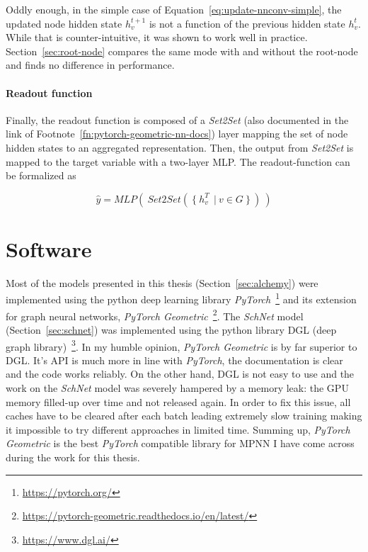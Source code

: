 \label{eq:update-nnconv-root}


Oddly enough, in the simple case of Equation~\ref{eq:update-nnconv-simple}, the updated node hidden state $h_v^{t+1}$ is not a function of the previous hidden state $h_v^t$. While that is counter-intuitive, it was shown to work well in practice. Section~\ref{sec:root-node} compares the same mode with and without the root-node and finds no difference in performance.

\paragraph{Readout function} Finally, the readout function is composed of a \textit{Set2Set} (also documented in the link of Footnote~\ref{fn:pytorch-geometric-nn-docs}) layer mapping the set of node hidden states to an aggregated representation. Then, the output from \textit{Set2Set} is mapped to the target variable with a two-layer MLP. The readout-function can be formalized as

\begin{equation}
		\hat{y} = MLP(~Set2Set(~\{~h_v^T\ ~|~ v \in G~\}~)~)
\end{equation}

\section{Software}

Most of the models presented in this thesis (Section~\ref{sec:alchemy}) were implemented using the python deep learning library \textit{PyTorch}~\footnote{\url{https://pytorch.org/}} and its extension for graph neural networks, \textit{PyTorch Geometric}~\footnote{\url{https://pytorch-geometric.readthedocs.io/en/latest/}}. The \textit{SchNet} model (Section~\ref{sec:schnet}) was implemented using the python library DGL (deep graph library)~\footnote{\url{https://www.dgl.ai/}}. In my humble opinion, \textit{PyTorch Geometric} is by far superior to DGL. It's API is much more in line with \textit{PyTorch}, the documentation is clear and the code works reliably. On the other hand, DGL is not easy to use and the work on the \textit{SchNet} model was severely hampered by a memory leak: the GPU memory filled-up over time and not released again. In order to fix this issue, all caches have to be cleared after each batch leading extremely slow training making it impossible to try different approaches in limited time. Summing up, \textit{PyTorch Geometric} is the best \textit{PyTorch} compatible library for MPNN I have come across during the work for this thesis.

